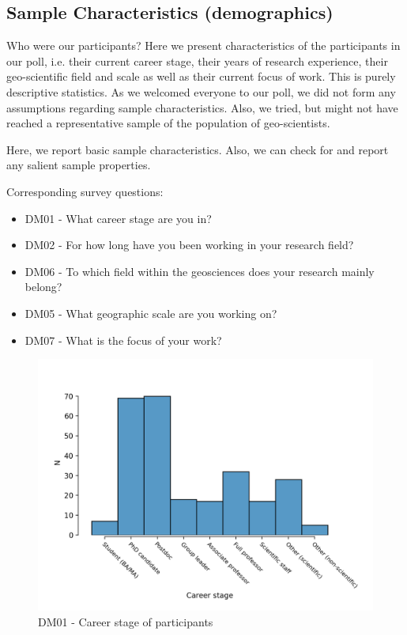 \documentclass{article}
\begin{document}
\subsection{Sample Characteristics (demographics)}
Who were our participants?
Here we present characteristics of the participants in our poll, i.e. their current career stage, their years of research experience, their geo-scientific field and scale as well as their current focus of work.
This is purely descriptive statistics.
As we welcomed everyone to our poll, we did not form any assumptions regarding sample characteristics.
Also, we tried, but might not have reached a representative sample of the population of geo-scientists.

Here, we report basic sample characteristics. Also, we can check for and report any salient sample properties.

Corresponding survey questions:

\begin{itemize}
	\item DM01 - What career stage are you in?
	\item DM02 - For how long have you been working in your research field?
	\item DM06 - To which field within the geosciences does your research mainly belong?
	\item DM05 - What geographic scale are you working on?
	\item DM07 - What is the focus of your work?
\end{itemize}

\begin{figure}[h!]
    \centering
    \includegraphics[width=\textwidth]{../figs/DM01.png}
	\caption{DM01 - Career stage of participants}
    \label{fig:dm01}
\end{figure}
\end{document}
